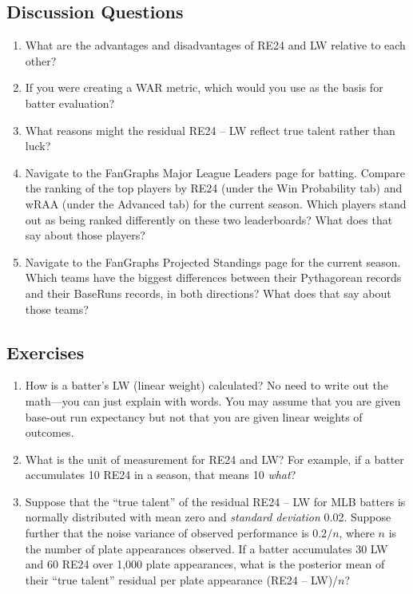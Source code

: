 \documentclass{article}
\begin{document}
    \subsection{\sc Discussion Questions}

      \begin{enumerate}
        \item What are the advantages and disadvantages of RE24 and LW relative to each other?
        \item If you were creating a WAR metric, which would you use as the basis for batter evaluation?
        \item What reasons might the residual RE24 -- LW reflect true talent rather than luck?
        \item Navigate to the FanGraphs Major League Leaders page for batting. Compare the ranking of the top players by RE24 (under the Win Probability tab) and wRAA (under the Advanced tab) for the current season. Which players stand out as being ranked differently on these two leaderboards? What does that say about those players?
        \item Navigate to the FanGraphs Projected Standings page for the current season. Which teams have the biggest differences between their Pythagorean records and their BaseRuns records, in both directions? What does that say about those teams?
      \end{enumerate}
    
    \subsection{\sc Exercises}

      \begin{enumerate}
        \item How is a batter's LW (linear weight) calculated? No need to write out the math---you can just explain with words. You may assume that you are given base-out run expectancy but not that you are given linear weights of outcomes.
        \item What is the unit of measurement for RE24 and LW? For example, if a batter accumulates 10 RE24 in a season, that means 10 {\it what}?
        \item Suppose that the ``true talent'' of the residual RE24 -- LW for MLB batters is normally distributed with mean zero and {\it standard deviation} 0.02. Suppose further that the noise variance of observed performance is $0.2/n$, where $n$ is the number of plate appearances observed. If a batter accumulates 30 LW and 60 RE24 over 1,000 plate appearances, what is the posterior mean of their ``true talent'' residual per plate appearance (RE24 -- LW)/$n$?
      \end{enumerate}
\end{document}
